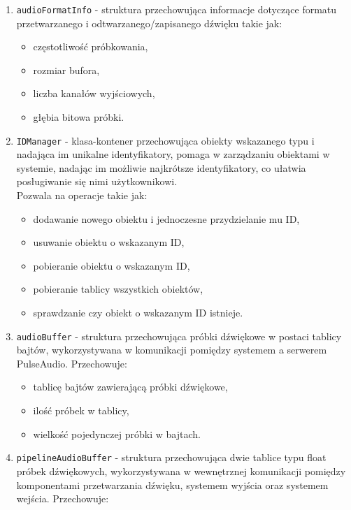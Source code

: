 \begin{enumerate}
    \item \texttt{audioFormatInfo} - struktura przechowująca informacje dotyczące formatu przetwarzanego i odtwarzanego/zapisanego dźwięku takie jak:
    \begin{itemize}
        \item częstotliwość próbkowania,
        \item rozmiar bufora,
        \item liczba kanałów wyjściowych,
        \item głębia bitowa próbki.
    \end{itemize}
    \item \texttt{IDManager} - klasa-kontener przechowująca obiekty wskazanego typu i nadająca im unikalne identyfikatory, pomaga w zarządzaniu obiektami w systemie, nadając im możliwie najkrótsze identyfikatory, co ułatwia posługiwanie się nimi użytkownikowi.
    \\
    Pozwala na operacje takie jak:
    \begin{itemize}
        \item dodawanie nowego obiektu i jednoczesne przydzielanie mu ID,
        \item usuwanie obiektu o wskazanym ID,
        \item pobieranie obiektu o wskazanym ID,
        \item pobieranie tablicy wszystkich obiektów,
        \item sprawdzanie czy obiekt o wskazanym ID istnieje.
    \end{itemize}
    \item \texttt{audioBuffer} - struktura przechowująca próbki dźwiękowe w postaci tablicy bajtów, wykorzystywana w komunikacji pomiędzy systemem a serwerem PulseAudio\cite{bib:PulseAudio}. Przechowuje:
    \begin{itemize}
        \item tablicę bajtów zawierającą próbki dźwiękowe,
        \item ilość próbek w tablicy,
        \item wielkość pojedynczej próbki w bajtach.
    \end{itemize}
    \item \texttt{pipelineAudioBuffer} - struktura przechowująca dwie tablice typu float próbek dźwiękowych, wykorzystywana w wewnętrznej komunikacji pomiędzy komponentami przetwarzania dźwięku, systemem wyjścia oraz systemem wejścia. Przechowuje:
    \begin{itemize}

\end{itemize}
\end{enumerate}
